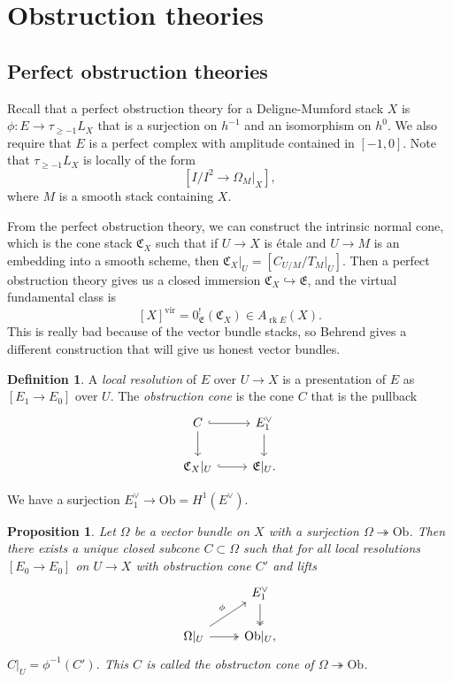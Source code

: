 \documentclass[leqno, openany]{memoir}
\newtheorem{prop}[thm]{Proposition}
\theoremstyle{definition}
\newtheorem{defn}[thm]{Definition}
\theoremstyle{remark}
\theoremstyle{plain}
\theoremstyle{definition}
\theoremstyle{remark}
\newcommand{\mf}[1]{\mathfrak{#1}}
\newcommand{\mr}[1]{\mathrm{#1}}
\newcommand{\on}[1]{\operatorname{#1}}
\begin{document}
\section{Obstruction theories}

\subsection{Perfect obstruction theories}

Recall that a perfect obstruction theory for a Deligne-Mumford stack $X$ is $\phi \colon E \to \tau_{\geq -1} L_X$ that is a surjection on $h^{-1}$ and an isomorphism on $h^0$. We also require that $E$ is a perfect complex with amplitude contained in $[-1, 0]$. Note that $\tau_{\geq -1} L_X$ is locally of the form
\[ [I/I^2 \to \Omega_M |_X], \]
where $M$ is a smooth stack containing $X$.

From the perfect obstruction theory, we can construct the intrinsic normal cone, which is the cone stack $\mf{C}_X$ such that if $U \to X$ is \'etale and $U \to M$ is an embedding into a smooth scheme, then $\mf{C}_X |_U = [C_{U/M} / T_M|_U]$. Then a perfect obstruction theory gives us a closed immersion $\mf{C}_X \hookrightarrow \mf{E}$, and the virtual fundamental class is
\[ [X]^{\mr{vir}} = 0^!_{\mf{E}}(\mf{C}_X) \in A_{\on{rk} E}(X). \]
This is really bad because of the vector bundle stacks, so Behrend gives a different construction that will give us honest vector bundles.

\begin{defn}
    A \textit{local resolution} of $E$ over $U \to X$ is a presentation of $E$ as $[E_1 \to E_0]$ over $U$. The \textit{obstruction cone} is the cone $C$ that is the pullback
    \begin{equation*}
    \begin{tikzcd}
        C \ar[hookrightarrow]{r} \ar{d} & E_1^{\vee} \ar{d} \\
        \mf{C}_{X} |_U \ar[hookrightarrow]{r} & \mf{E} |_U.
    \end{tikzcd}
    \end{equation*}
\end{defn}
We have a surjection $E_1^{\vee} \to \mr{Ob} = H^1(E^{\vee})$.

\begin{prop}
    Let $\Omega$ be a vector bundle on $X$ with a surjection $\Omega \twoheadrightarrow \mr{Ob}$. Then there exists a unique closed subcone $C \subset \Omega$ such that for all local resolutions $[E_0 \to E_0]$ on $U \to X$ with obstruction cone $C'$ and lifts
    \begin{equation*}
    \begin{tikzcd}
        & E_1^{\vee} \ar[twoheadrightarrow]{d} \\
        \Omega |_U \ar{ur}{\phi} \ar[twoheadrightarrow]{r} & \mr{Ob} |_U,
    \end{tikzcd}
    \end{equation*}
    $C|_U = \phi^{-1}(C')$. This $C$ is called the \textit{obstructon cone} of $\Omega \twoheadrightarrow \mr{Ob}$.
\end{prop}
\end{document}
